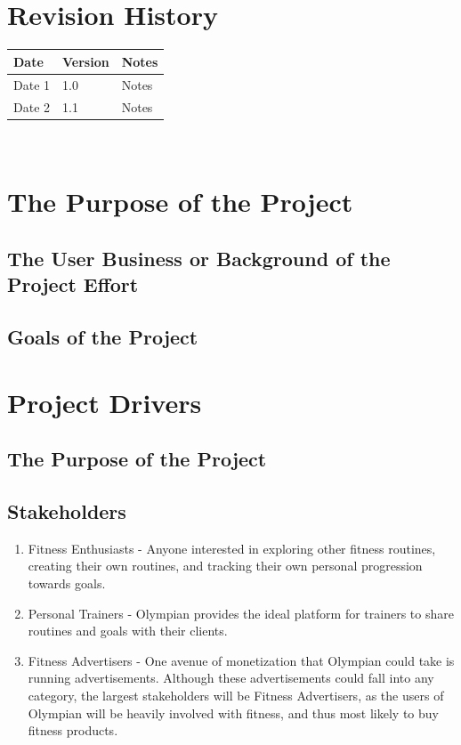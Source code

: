 \documentclass[12pt]{article}
\begin{document}
	
\maketitle

~\newpage


\tableofcontents

~\newpage

\section*{Revision History}

\begin{tabularx}{\textwidth}{p{3cm}p{2cm}X}
\toprule {\bf Date} & {\bf Version} & {\bf Notes}\\
\midrule
Date 1 & 1.0 & Notes\\
Date 2 & 1.1 & Notes\\
\bottomrule
\end{tabularx}

~\newpage


\section{The Purpose of the Project}
\subsection{The User Business or Background of the Project Effort}
\subsection{Goals of the Project}


\section{Project Drivers}
\subsection{The Purpose of the Project}
\subsection{Stakeholders}
\begin{enumerate}
	\item Fitness Enthusiasts - Anyone interested in exploring other fitness routines, creating their own routines, and tracking their own personal progression towards goals.
	\item Personal Trainers - Olympian provides the ideal platform for trainers to share routines and goals with their clients.
	\item Fitness Advertisers - One avenue of monetization that Olympian could take is running advertisements. Although these advertisements could fall into any category, the largest stakeholders will be Fitness Advertisers,
	as the users of Olympian will be heavily involved with fitness, and thus most likely to buy fitness products.
\end{enumerate} 
\end{document}
